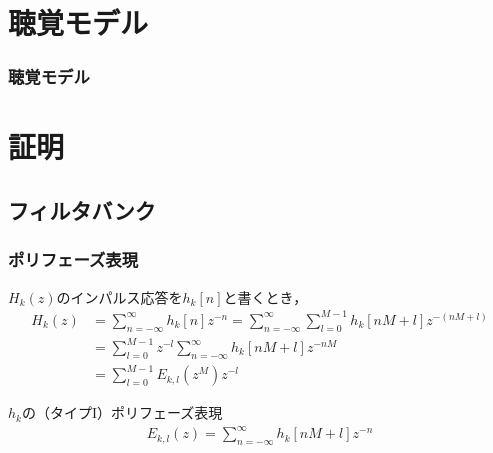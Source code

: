 \documentclass[14pt,xcolor=dvipsnames,table,dvipdfmx]{beamer}
\begin{document}
\section{聴覚モデル}

\begin{frame}[c]
    \frametitle{聴覚モデル}
\end{frame}

\appendix

\section{証明}

\subsection{フィルタバンク} \label{sec:proofs_filter_bank}

\begin{frame}[c]
    \frametitle{ポリフェーズ表現}
    $H_{k}(z)$のインパルス応答を$h_{k}[n]$と書くとき，
    \small
    \begin{align*}
        H_{k}(z) &= \sum_{n = -\infty}^{\infty} h_{k}[n] z^{-n} = \sum_{n = -\infty}^{\infty} \sum_{l = 0}^{M - 1} h_{k}[nM + l] z^{-(nM+l)} \\
        &= \sum_{l = 0}^{M - 1} z^{-l} \sum_{n = -\infty}^{\infty}h_{k}[nM + l] z^{-nM} \\
        &= \sum_{l = 0}^{M - 1} E_{k,l}(z^{M}) z^{-l}
    \end{align*}
    \normalsize
    \begin{block}{$h_{k}$の（タイプI）ポリフェーズ表現}
        \vspace{-13pt}
        \begin{align}
            E_{k,l}(z) = \sum_{n = -\infty}^{\infty} h_{k}[nM + l] z^{-n} \label{eq:type1_polyphase_representation}
        \end{align}
    \end{block}
\end{frame}
\end{document}
